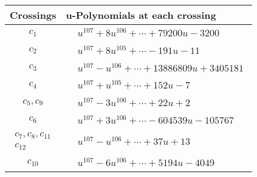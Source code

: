 \documentclass[1p]{elsarticle_modified}
\theoremstyle{definition}
\begin{document}
\begin{tabular}{m{50pt}|m{274pt}}
Crossings & \hspace{64pt}u-Polynomials at each crossing \\
\hline $$\begin{aligned}c_{1}\end{aligned}$$&$\begin{aligned}
&u^{107}+8 u^{106}+\cdots+79200 u-3200
\end{aligned}$\\
\hline $$\begin{aligned}c_{2}\end{aligned}$$&$\begin{aligned}
&u^{107}+8 u^{105}+\cdots-191 u-11
\end{aligned}$\\
\hline $$\begin{aligned}c_{3}\end{aligned}$$&$\begin{aligned}
&u^{107}- u^{106}+\cdots+13886809 u+3405181
\end{aligned}$\\
\hline $$\begin{aligned}c_{4}\end{aligned}$$&$\begin{aligned}
&u^{107}+u^{105}+\cdots+152 u-7
\end{aligned}$\\
\hline $$\begin{aligned}c_{5},c_{9}\end{aligned}$$&$\begin{aligned}
&u^{107}-3 u^{106}+\cdots+22 u+2
\end{aligned}$\\
\hline $$\begin{aligned}c_{6}\end{aligned}$$&$\begin{aligned}
&u^{107}+3 u^{106}+\cdots-604539 u-105767
\end{aligned}$\\
\hline $$\begin{aligned}c_{7},c_{8},c_{11}\\c_{12}\end{aligned}$$&$\begin{aligned}
&u^{107}- u^{106}+\cdots+37 u+13
\end{aligned}$\\
\hline $$\begin{aligned}c_{10}\end{aligned}$$&$\begin{aligned}
&u^{107}-6 u^{106}+\cdots+5194 u-4049
\end{aligned}$\\
\hline
\end{tabular}\\~\\
\end{document}
